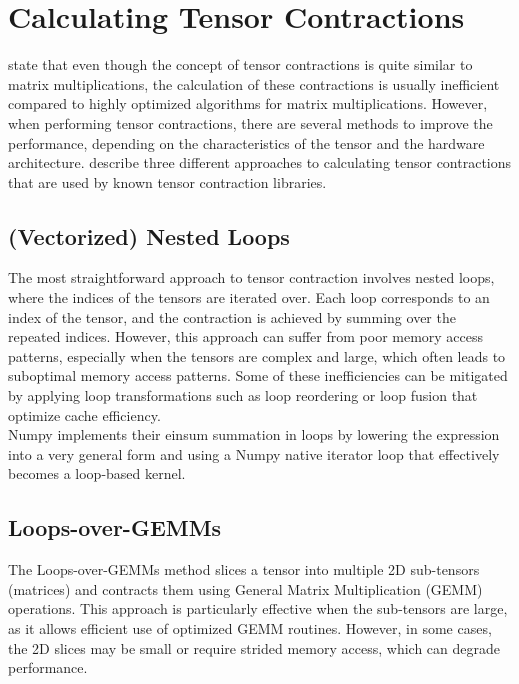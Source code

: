\section{Calculating Tensor Contractions}
\textcite{springer} state that even though the concept of tensor contractions is quite similar to matrix multiplications, the calculation of these contractions is usually inefficient compared to highly optimized algorithms for matrix multiplications. However, when performing tensor contractions, there are several methods to improve the performance, depending on the characteristics of the tensor and the hardware architecture. \textcite{springer} describe three different approaches to calculating tensor contractions that are used by known tensor contraction libraries.  

\subsection{(Vectorized) Nested Loops}
The most straightforward approach to tensor contraction involves nested loops, where the indices of the tensors are iterated over. Each loop corresponds to an index of the tensor, and the contraction is achieved by summing over the repeated indices. However, this approach can suffer from poor memory access patterns, especially when the tensors are complex and large, which often leads to suboptimal memory access patterns. Some of these inefficiencies can be mitigated by applying loop transformations such as loop reordering or loop fusion that optimize cache efficiency.\\
Numpy \cite{Numpy} implements their einsum summation in loops by lowering the expression into a very general form and using a Numpy native iterator loop that effectively becomes a loop-based kernel.

\subsection{Loops-over-GEMMs}
The Loops-over-GEMMs method slices a tensor into multiple 2D sub-tensors (matrices) and contracts them using General Matrix Multiplication (GEMM) operations. This approach is particularly effective when the sub-tensors are large, as it allows efficient use of optimized GEMM routines. However, in some cases, the 2D slices may be small or require strided memory access, which can degrade performance.


